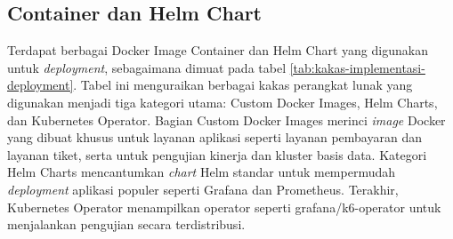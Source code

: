 \subsection{Container dan Helm Chart}

Terdapat berbagai Docker Image Container dan Helm Chart yang digunakan untuk \textit{deployment}, sebagaimana dimuat pada tabel \ref{tab:kakas-implementasi-deployment}. Tabel ini menguraikan berbagai kakas perangkat lunak yang digunakan menjadi tiga kategori utama: Custom Docker Images, Helm Charts, dan Kubernetes Operator. Bagian Custom Docker Images merinci \textit{image} Docker yang dibuat khusus untuk layanan aplikasi seperti layanan pembayaran dan layanan tiket, serta untuk pengujian kinerja dan kluster basis data. Kategori Helm Charts mencantumkan \textit{chart} Helm standar untuk mempermudah \textit{deployment} aplikasi populer seperti Grafana dan Prometheus. Terakhir, Kubernetes Operator menampilkan operator seperti grafana/k6-operator untuk menjalankan pengujian secara terdistribusi.

\pagebreak

